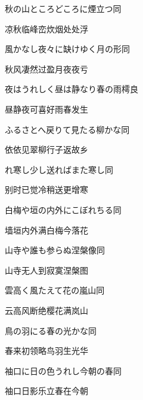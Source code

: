 \begin{haiku}
    {\FH 秋の山ところどころに煙立つ}\hfill{\FH 同}

    {\FK 凉秋临峰峦炊烟处处浮}
\end{haiku}

\begin{haiku}
    {\FH 風かなし夜々に缺けゆく月の形}\hfill{\FH 同}

    {\FK 秋风凄然过盈月夜夜亏}
\end{haiku}

\begin{haiku}
    {\FH 夜はうれしく昼は静なり春の雨}\hfill{\FH 樗良}

    {\FK 昼静夜可喜好雨春发生}
\end{haiku}

\begin{haiku}
    {\FH ふるさとへ戻りて見たる柳かな}\hfill{\FH 同}

    {\FK 依依见翠柳行子返故乡}
\end{haiku}

\begin{haiku}
    {\FH {}れ寒し少し送ればまた寒し}\hfill{\FH 同}

    {\FK 别时已觉冷稍送更增寒}
\end{haiku}

\begin{haiku}
    {\FH 白梅や垣の内外にこぼれちる}\hfill{\FH 同}

    {\FK 墙垣内外满白梅今落花}
\end{haiku}

\begin{haiku}
    {\FH 山寺や誰も参らぬ涅槃像}\hfill{\FH 同}

    {\FK 山寺无人到寂寞涅槃图}
\end{haiku}

\begin{haiku}
    {\FH 雲高く風たえて花の嵐山}\hfill{\FH 同}

    {\FK 云高风断绝樱花满岚山}
\end{haiku}

\begin{haiku}
    {\FH 鳥の羽にる春の光かな}\hfill{\FH 同}

    {\FK 春来初领略鸟羽生光华}
\end{haiku}

\begin{haiku}
    {\FH 袖口に日の色うれし今朝の春}\hfill{\FH 同}

    {\FK 袖口日影乐立春在今朝}
\end{haiku}

